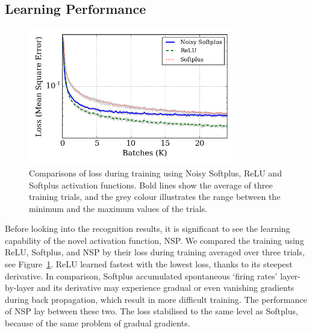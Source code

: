 	\subsection{Learning Performance}
	\label{subsec:result_compare}
	\begin{figure}[tbp!]
		\centering
		\DIFdelbeginFL %
\DIFdelendFL \DIFaddbeginFL \includegraphics[width=0.8\textwidth]{pics_iconip/revise_8.png}
		\DIFaddendFL \caption[Comparisons of loss during training.]{Comparisons of loss during training using Noisy Softplus, ReLU and Softplus activation functions. Bold lines show the average of three training trials, and the grey colour illustrates the range between the minimum and the maximum values of the trials.  }
		\label{Fig:loss_ns}
	\end{figure}
	Before looking into the recognition results, it is significant to see the learning capability of the novel activation function, NSP.
	We compared the training using ReLU, Softplus, and NSP by their loss during training averaged over three trials, see Figure~\ref{Fig:loss_ns}.
	ReLU learned fastest with the lowest loss, thanks to its steepest derivative.
	In comparison, Softplus accumulated spontaneous `firing rates' layer-by-layer and its derivative may experience gradual or even vanishing gradients during back propagation, which result in more difficult training.
	The \DIFaddbegin {}\DIFaddend performance of NSP lay between these two\DIFdelbegin {}\DIFdelend .
	The loss stabilised to the same level as Softplus, because of the same problem of gradual gradients.

